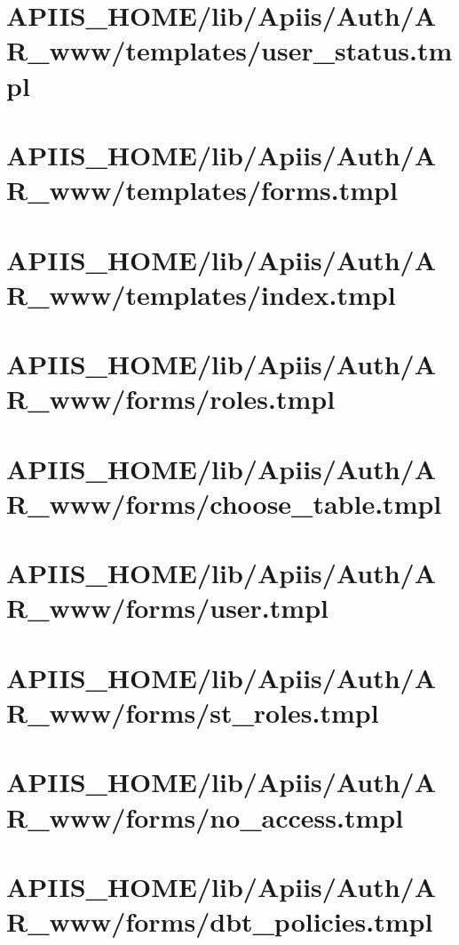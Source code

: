 \section{APIIS\_HOME/lib/Apiis/Auth/AR_www/templates/user\_status.tmpl} 
\section{APIIS\_HOME/lib/Apiis/Auth/AR_www/templates/forms.tmpl} 
\section{APIIS\_HOME/lib/Apiis/Auth/AR_www/templates/index.tmpl} 
\section{APIIS\_HOME/lib/Apiis/Auth/AR_www/forms/roles.tmpl} 
\section{APIIS\_HOME/lib/Apiis/Auth/AR_www/forms/choose\_table.tmpl} 
\section{APIIS\_HOME/lib/Apiis/Auth/AR_www/forms/user.tmpl} 
\section{APIIS\_HOME/lib/Apiis/Auth/AR_www/forms/st\_roles.tmpl} 
\section{APIIS\_HOME/lib/Apiis/Auth/AR_www/forms/no\_access.tmpl} 
\section{APIIS\_HOME/lib/Apiis/Auth/AR_www/forms/dbt\_policies.tmpl} 
